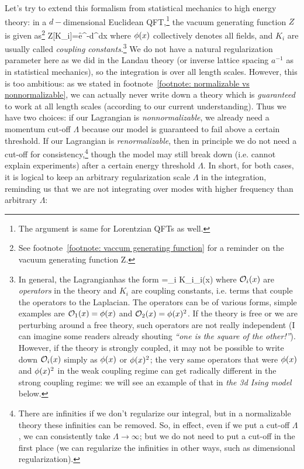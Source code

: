 Let's try to extend this formalism from statistical mechanics to high energy theory: in a $d-$dimensional Euclidean QFT,\footnote{The argument is same for Lorentzian QFTs as well.} the vacuum generating function $Z$ is given as\footnote{See footnote~\ref{footnote: vaccum generating function} for a reminder on the vacuum generating function Z.} 
\be 
Z[K_i]=\int \cD \f e^{-\int d^dx\cL[K_i,\f(x)]}
\ee 
where $\phi(x)$ collectively denotes all fields, and $K_i$ are usually called \emph{coupling constants}.\footnote{In general, the Lagrangian\footnotemark has the form
	\be 
	\label{eq: most general form of Lagrangian}
	\cL[K_i,\f(x)]=\sum_i K_i\cO_i(x)
	\ee 
	where $\mathcal{O}_i(x)$ are \emph{operators} in the theory and $K_i$ are coupling constants, i.e. terms that couple the operators to the Laplacian. The operators can be of various forms, simple examples are $\mathcal{O}_1(x)=\phi(x)$ and $\mathcal{O}_2(x)=\phi(x)^2$. If the theory is free or we are perturbing around a free theory, such operators are not really independent (I can imagine some readers already shouting \emph{``one is the square of the other!''}). However, if the theory is strongly coupled, it may not be possible to write down $\mathcal{O}_i(x)$ simply as $\phi(x)$ or $\phi(x)^2$; the very same operators that were $\phi(x)$ and $\phi(x)^2$ in the weak coupling regime can get radically different in the strong coupling regime: we will see an example of that in \emph{the 3d Ising model} below.
} We do not have a natural regularization parameter here as we did in the Landau theory (or inverse lattice spacing $a^{-1}$ as in statistical mechanics), so the integration is \naively over all length scales. However, this is too ambitious: as we stated in footnote~\ref{footnote: normalizable vs nonnormalizable}, we can actually never write down a theory which is \emph{guaranteed} to work at all length scales (according to our current understanding). Thus we have two choices: if our Lagrangian is \emph{nonnormalizable}, we already need a momentum cut-off $\Lambda$ because our model is guaranteed to fail above a certain threshold. If our Lagrangian is \emph{renormalizable}, then in principle we do not need a cut-off for consistency,\footnote{There are infinities if we don't regularize our integral, but in a normalizable theory these infinities can be removed. So, in effect, even if we put a cut-off $\Lambda$, we can consistently take $\Lambda\rightarrow\infty$; but we do not need to put a cut-off in the first place (we can regularize the infinities in other ways, such as dimensional regularization).} though the model may still break down (i.e. cannot explain experiments) after a certain energy threshold $\Lambda$. In short, for both cases, it is logical to keep an arbitrary regularization scale $\Lambda$ in the integration, reminding us that we are not integrating over modes  with higher frequency than arbitrary $\Lambda$:
